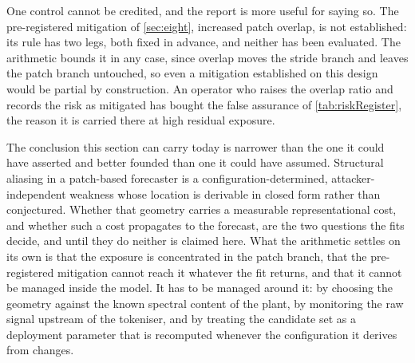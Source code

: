 One control cannot be credited, and the report is more useful for saying so. The pre-registered mitigation of \autoref{sec:eight}, increased patch overlap, is not established: its rule has two legs, both fixed in advance, and neither has been evaluated. The arithmetic bounds it in any case, since overlap moves the stride branch and leaves the patch branch untouched, so even a mitigation established on this design would be partial by construction. An operator who raises the overlap ratio and records the risk as mitigated has bought the false assurance of \autoref{tab:riskRegister}, the reason it is carried there at high residual exposure.

The conclusion this section can carry today is narrower than the one it could have asserted and better founded than one it could have assumed. Structural aliasing in a patch-based forecaster is a configuration-determined, attacker-independent weakness whose location is derivable in closed form rather than conjectured. Whether that geometry carries a measurable representational cost, and whether such a cost propagates to the forecast, are the two questions the fits decide, and until they do neither is claimed here. What the arithmetic settles on its own is that the exposure is concentrated in the patch branch, that the pre-registered mitigation cannot reach it whatever the fit returns, and that it cannot be managed inside the model. It has to be managed around it: by choosing the geometry against the known spectral content of the plant, by monitoring the raw signal upstream of the tokeniser, and by treating the candidate set as a deployment parameter that is recomputed whenever the configuration it derives from changes.